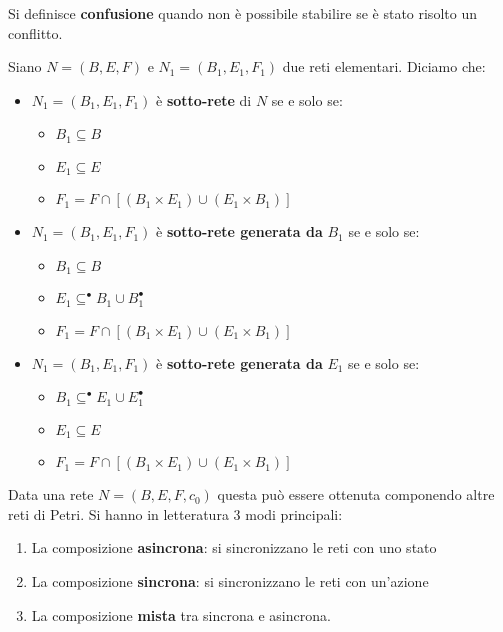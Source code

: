 Si definisce \textbf{confusione} quando non è possibile stabilire se è stato
risolto un conflitto.
\begin{definizione}
    Siano $N = (B, E, F)$ e $N_1 = (B_1, E_1, F_1)$ due reti elementari. Diciamo che:
    \begin{itemize}
        \item $N_1 = (B_1, E_1, F_1)$ è \textbf{sotto-rete} di $N$ se e solo se:
              \begin{itemize}
                  \item $B_1 \subseteq B$
                  \item $E_1 \subseteq E$
                  \item $F_1 = F \cap [(B_1 \times E_1) \cup (E_1 \times B_1)]$
              \end{itemize}
        \item $N_1 = (B_1, E_1, F_1)$ è \textbf{sotto-rete generata da} $B_1$ se e solo se:
              \begin{itemize}
                  \item $B_1 \subseteq B$
                  \item $E_1 \subseteq ^{\bullet} B_1 \cup B_1^{\bullet}$
                  \item $F_1 = F \cap [(B_1 \times E_1) \cup (E_1 \times B_1)]$
              \end{itemize}
        \item $N_1 = (B_1, E_1, F_1)$ è \textbf{sotto-rete generata da} $E_1$ se e solo se:
              \begin{itemize}
                  \item $B_1 \subseteq ^{\bullet} E_1 \cup E_1^{\bullet}$
                  \item $E_1 \subseteq E$
                  \item $F_1 = F \cap [(B_1 \times E_1) \cup (E_1 \times B_1)]$
              \end{itemize}
    \end{itemize}
\end{definizione}
Data una rete $N = (B,E, F, c_0)$ questa può essere ottenuta componendo altre
reti di Petri. Si hanno in letteratura 3 modi principali:
\begin{enumerate}
    \item La composizione \textbf{asincrona}: si sincronizzano le reti con uno stato
    \item La composizione \textbf{sincrona}: si sincronizzano le reti con un'azione
    \item La composizione \textbf{mista} tra sincrona e asincrona.
\end{enumerate}
